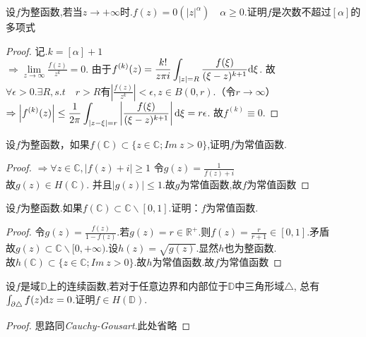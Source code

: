 \begin{eg}
	设$f$为整函数,若当$z\rightarrow+\infty$时.$f(z)=0(|z|^\alpha)\quad\alpha\geq0$.证明$f$是次数不超过$[\alpha]$的多项式
\end{eg}
\begin{proof}
	记.$k=[\alpha]+1$\\
	$\displaystyle{\Rightarrow\lim\limits_{z\to\infty}\frac{f(z)}{z^k}=0}$.
	由于$\displaystyle{f^{(k)}(z)=\frac{k!}{z\pi i}\int_{|z|=R}\frac{f(\xi)}{(\xi-z)^{k+1}}\mathrm{d}\xi}$.
	故$\forall\epsilon>0.\exists R, s.t\quad r>R$有$\displaystyle{\left|\frac{f(z)}{z^k}\right|<\epsilon,z\in B(0,r)}$.（令$r\rightarrow\infty$）\\
	$\displaystyle{\Rightarrow\left|f^{(k)}(z)\right|\leq\frac{1}{2\pi}\int_{|z-\xi|=r}\left|\frac{f(\xi)}{(\xi-z)^{k+1}}\right|\mathrm{d}\xi=r\epsilon}$.
	故$f^{(k)}\equiv0$.
\end{proof}



\begin{eg}
	设$f$为整函数，如果$f(\mathbb{C})\subset\{z\in\mathbb{C};I\!m\ z>0\}$,证明$f$为常值函数.
\end{eg}
\begin{proof}
	$\Rightarrow \forall z\in \mathbb{C}, |f(z)+i|\geq 1$ \quad 令$\displaystyle{g(z)=\frac{1}{f(z)+i}}$\\
	故$g(z)\in H(\mathbb{C})$. 并且\quad$|g(z)|\leq1$.故$g$为常值函数,故$f$为常值函数
\end{proof}

\begin{eg}
	设$f$为整函数.如果$f(\mathbb{C})\subset\mathbb{C}\backslash[0,1]$.证明：$f$为常值函数.
\end{eg}
\begin{proof}
	令$\displaystyle{g(z)=\frac{f(z)}{1-f(z)}}$.若$g(z)=r\in\mathbb{R}^+$.则$\displaystyle{f(z)=\frac{r}{r+1}\in[0,1]}$.矛盾\\
	故$g(z)\subset\mathbb{C}\backslash[0,+\infty)$.设$h(z)=\sqrt{g(z)}$.显然$h$也为整函数.\\
	故$h(\mathbb{C})\subset\{z\in\mathbb{C};I\!m\ z>0\}$.故$h$为常值函数.故$f$为常值函数
\end{proof}

\begin{eg}
	设$f$是域$\mathbb{D}$上的连续函数,若对于任意边界和内部位于$\mathbb{D}$中三角形域$\triangle$,
	总有$\int_{\partial\triangle}f(z)\mathrm{d}z=0$.证明$f\in H(\mathbb{D})$.
\end{eg}
\begin{proof}
	思路同\emph{Cauchy-Gousart}.此处省略
\end{proof}

